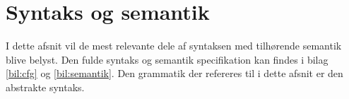 \section{Syntaks og semantik}\label{sec:Syntax}
I dette afsnit vil de mest relevante dele af syntaksen med tilhørende semantik blive belyst. Den fulde syntaks og semantik specifikation kan findes i bilag \ref{bil:cfg} og \ref{bil:semantik}. Den grammatik der refereres til i dette afsnit er den abstrakte syntaks.



%

